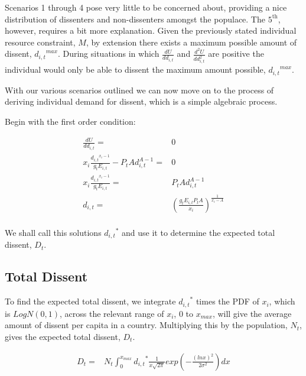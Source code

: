 \documentclass[12pt]{article}
\begin{document}
\begin{spacing}{1.5}
Scenarios 1 through 4 pose very little to be concerned about, providing a nice distribution of dissenters and non-dissenters amongst the populace. The $\text{5}^{\text{th}}$, however, requires a bit more explanation. Given the previously stated individual resource constraint, $M$, by extension there exists a maximum possible amount of dissent, ${d_{i,t}}^{max}$. During situations in which $\frac{dU}{dd_{i,t}}$ and $\frac{d^2U}{dd_{i,t}^2}$ are positive the individual would only be able to dissent the maximum amount possible, ${d_{i,t}}^{max}$.  

With our various scenarios outlined we can now move on to the process of deriving individual demand for dissent, which is a simple algebraic process. 

\vspace{1 em}
\noindent Begin with the first order condition: 

\begin{equation}
	\begin{aligned}
\frac{dU}{dd_{i,t}}=& 0\\ 
x_i \frac{{d_{i,t}}^{x_i -1}}{g_t E_{i,t}} - P_t Ad_{i,t}^{A-1}=& 0 \\
	x_i \frac{{d_{i,t}}^{x_i -1}}{g_t E_{i,t}} =& P_t Ad_{i,t}^{A-1}\\
		d_{i,t}=& \left(\frac{g_tE_{i,t}P_t A}{x_i} \right)^{\frac{1}{x_i -A}}\\ 	
	\end{aligned}
\end{equation}

We shall call this solutions ${d_{i,t}}^*$ and use it to determine the expected total dissent, $D_t$. 
     
   
\subsection{Total Dissent}

 
To find the expected total dissent, we integrate ${d_{i,t}}^*$ times the PDF of $x_i$, which is $LogN(0,1)$, across the relevant range of $x_i$, $0$ to $x_{max}$, will give the average amount of dissent per capita in a country. Multiplying this by the population, $N_t$, gives the expected total dissent, $D_t$.

\begin{equation}
	\begin{aligned}
D_t	=& N_t \int_{0}^{x_{max}} {{d}_{i,t}}^* \frac{1}{x \sqrt{2\pi}}exp  \left( -\frac{(lnx)^2}{2\sigma^2} \right)  dx \\	
	\end{aligned}
\end{equation}



\end{spacing}
\end{document}
